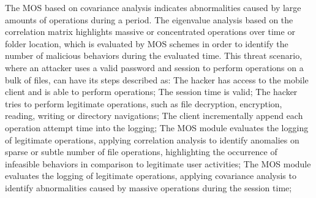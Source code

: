 \documentclass[twocolumn]{svjour3}          %
\begin{document}
The MOS based on covariance analysis indicates abnormalities caused by large amounts of operations during a period. The eigenvalue analysis based on the correlation matrix highlights massive or concentrated operations over time or folder location, which is evaluated by MOS schemes in order to identify the number of malicious behaviors during the evaluated time.
This threat scenario, where an attacker uses a valid password and session to perform operations on a bulk of files, can have its steps described as:
The hacker has access to the mobile client and is able to perform operations;
The session time is valid;
The hacker tries to perform legitimate operations, such as file decryption, encryption, reading, writing or directory navigations;
The client incrementally append each operation attempt time into the logging;
The MOS module evaluates the logging of legitimate operations, applying correlation analysis to identify anomalies on sparse or subtle number of file operations, highlighting the occurrence of infeasible behaviors in comparison to legitimate user activities;
The MOS module evaluates the logging of legitimate operations, applying covariance analysis to identify abnormalities caused by massive operations during the session time;
\end{document}
